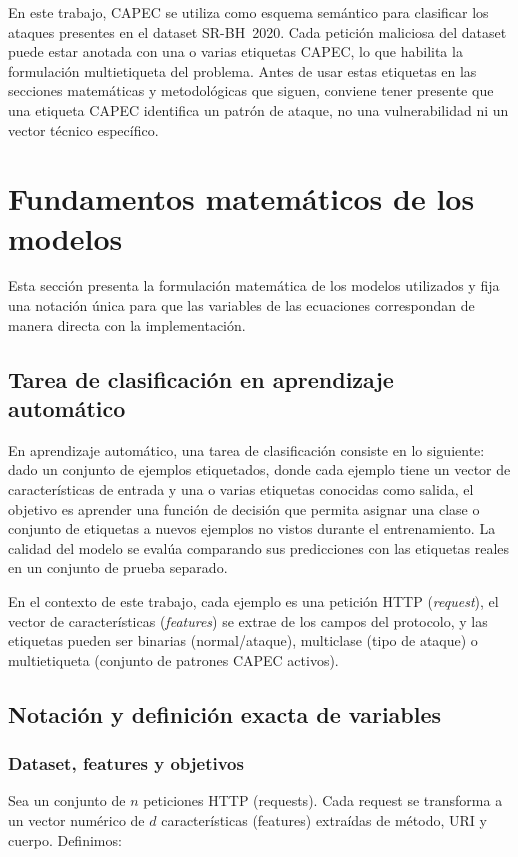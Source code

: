 \documentclass[12pt,oneside]{report}
\begin{document}
En este trabajo, CAPEC se utiliza como esquema semántico para clasificar los ataques presentes en el dataset SR-BH~2020. Cada petición maliciosa del dataset puede estar anotada con una o varias etiquetas CAPEC, lo que habilita la formulación multietiqueta del problema. Antes de usar estas etiquetas en las secciones matemáticas y metodológicas que siguen, conviene tener presente que una etiqueta CAPEC identifica un patrón de ataque, no una vulnerabilidad ni un vector técnico específico.

\section{Fundamentos matemáticos de los modelos}

Esta sección presenta la formulación matemática de los modelos utilizados y fija una notación única
para que las variables de las ecuaciones correspondan de manera directa con la implementación.

\subsection{Tarea de clasificación en aprendizaje automático}

En aprendizaje automático, una tarea de clasificación consiste en lo siguiente: dado un conjunto de ejemplos etiquetados, donde cada ejemplo tiene un vector de características de entrada y una o varias etiquetas conocidas como salida, el objetivo es aprender una función de decisión que permita asignar una clase o conjunto de etiquetas a nuevos ejemplos no vistos durante el entrenamiento. La calidad del modelo se evalúa comparando sus predicciones con las etiquetas reales en un conjunto de prueba separado.

En el contexto de este trabajo, cada ejemplo es una petición HTTP (\textit{request}), el vector de características (\textit{features}) se extrae de los campos del protocolo, y las etiquetas pueden ser binarias (normal/ataque), multiclase (tipo de ataque) o multietiqueta (conjunto de patrones CAPEC activos).


\subsection{Notación y definición exacta de variables}

\subsubsection{Dataset, features y objetivos}
Sea un conjunto de $n$ peticiones HTTP (requests). Cada request se transforma a un vector numérico de $d$ características (features)
extraídas de método, URI y cuerpo. Definimos:
\end{document}
